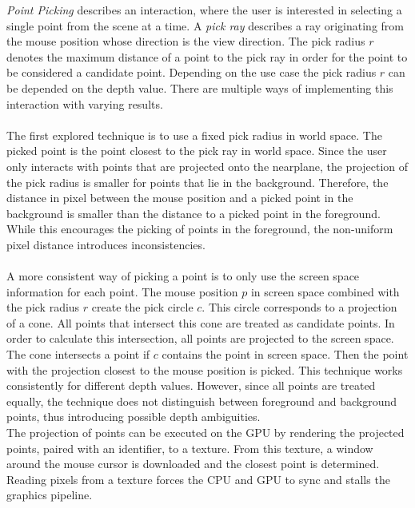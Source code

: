 \textit{Point Picking} describes an interaction, where the user is interested in selecting a single point from the scene at a time. A \textit{pick ray} describes a ray originating from the mouse position whose direction is the view direction. The pick radius $r$ denotes the maximum distance of a point to the pick ray in order for the point to be considered a candidate point. Depending on the use case the pick radius $r$ can be depended on the depth value. There are multiple ways of implementing this interaction with varying results. 
\\
\\
The first explored technique is to use a fixed pick radius in world space. The picked point is the point closest to the pick ray in world space. Since the user only interacts with points that are projected onto the nearplane, the projection of the pick radius is smaller for points that lie in the background. Therefore, the distance in pixel between the mouse position and a picked point in the background is smaller than the distance to a picked point in the foreground. While this encourages the picking of points in the foreground, the non-uniform pixel distance introduces inconsistencies. 
\\
\\
A more consistent way of picking a point is to only use the screen space information for each point. The mouse position $p$ in screen space combined with the pick radius $r$ create the pick circle $c$. This circle corresponds to a projection of a cone. All points that intersect this cone are treated as candidate points. In order to calculate this intersection, all points are projected to the screen space. The cone intersects a point if $c$ contains the point in screen space. Then the point with the projection closest to the mouse position is picked. This technique works consistently for different depth values. However, since all points are treated equally, the technique does not distinguish between foreground and background points, thus introducing possible depth ambiguities. 
\\
The projection of points can be executed on the GPU by rendering the projected points, paired with an identifier, to a texture. From this texture, a window around the mouse cursor is downloaded and the closest point is determined. Reading pixels from a texture forces the CPU and GPU to sync and stalls the graphics pipeline. 
\\
\\
